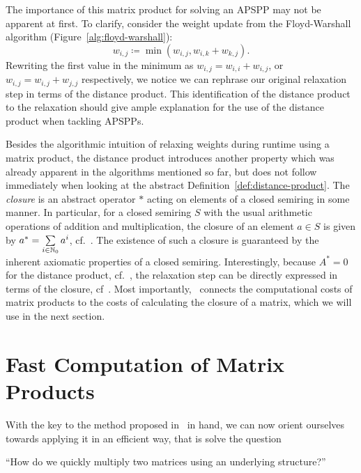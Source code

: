The importance of this matrix product for solving an APSPP may not be apparent at first.
To clarify, consider the weight update from the Floyd-Warshall algorithm (Figure~\ref{alg:floyd-warshall}):
\[
    w_{i, j} \coloneqq \min(w_{i, j}, w_{i, k} + w_{k, j}).
\]
Rewriting the first value in the minimum as $w_{i, j} = w_{i, i} + w_{i, j}$, or $w_{i, j} = w_{i, j} + w_{j, j}$ respectively, we notice we can rephrase our original relaxation step in terms of the distance product.
This identification of the distance product to the relaxation should give ample explanation for the use of the distance product when tackling APSPPs.

Besides the algorithmic intuition of relaxing weights during runtime using a matrix product, the distance product introduces another property which was already apparent in the algorithms mentioned so far, but does not follow immediately when looking at the abstract Definition~\ref{def:distance-product}.
The \emph{closure} is an abstract operator $*$ acting on elements of a closed semiring in some manner.
In particular, for a closed semiring $S$ with the usual arithmetic operations of addition and multiplication, the closure of an element $a \in S$ is given by $a^* = \sum\limits_{i \in \mathbb{N}_{0}} a^i$, cf.~\cite[Section~5.6]{Aho1974}.
The existence of such a closure is guaranteed by the inherent axiomatic properties of a closed semiring.
Interestingly, because $A^* = 0$ for the distance product, cf.~\cite[Example~5.10]{Aho1974}, the relaxation step can be directly expressed in terms of the closure, cf~\cite[Section~5.8]{Aho1974}.
Most importantly,\ \cite[Section~5.9, Corollary~2]{Aho1974} connects the computational costs of matrix products to the costs of calculating the closure of a matrix, which we will use in the next section.

\section{Fast Computation of Matrix Products}\label{sec:fast-matrix-products}

With the key to the method proposed in~\cite{Chan2007} in hand, we can now orient ourselves towards applying it in an efficient way, that is solve the question
\begin{displayquote}
    ``How do we quickly multiply two matrices using an underlying structure?''
\end{displayquote}

